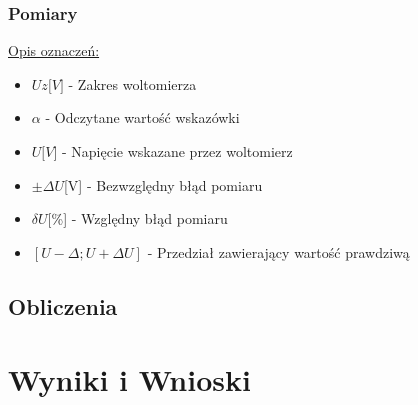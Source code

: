 \documentclass{extarticle}  %
\begin{document}
            \subsubsection{Pomiary}
                \begin{table}[H]
                    \caption{Wyniki pomiarowe oraz błędy pomiarowe dla ustalonego napięcia 3V }
                    \centering
                \end{table}
                \underline{Opis oznaczeń:}
                \begin{itemize}
                    \item $Uz{[}V{]}$ - Zakres woltomierza
                    \item $\alpha$ - Odczytane wartość wskazówki
                    \item $U{[}V{]}$ - Napięcie wskazane przez woltomierz
                    \item $\pm \Delta U${[}V{]} - Bezwzględny błąd pomiaru
                    \item $\delta U${[}\%{]} - Względny błąd pomiaru
                    \item $[U-\Delta ; U+\Delta U] $ - Przedział zawierający wartość prawdziwą
                \end{itemize}
        \subsection{Obliczenia}

    \section{Wyniki i Wnioski}
    
\end{document}
